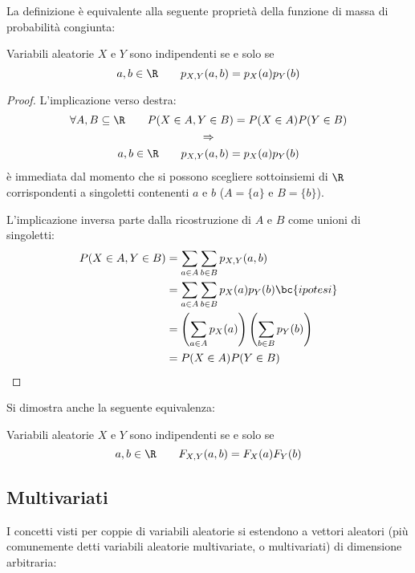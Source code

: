 La definizione è equivalente alla seguente proprietà della funzione di massa di probabilità congiunta:
\begin{prop}
	Variabili aleatorie $X$ e $Y$ sono indipendenti se e solo se
	\begin{equation*}
		a,b\in\R\qquad p_{X,Y}(a,b)=p_X(a)p_Y(b)
	\end{equation*}
\end{prop}
\begin{proof}
	L'implicazione verso destra:
	\begin{gather*}
		\forall A,B\subseteq\R\qquad P(X\in A, Y\in B)=P(X\in A)P(Y\in B) \\
		\Rightarrow \\
		a,b\in\R\qquad p_{X,Y}(a,b)=p_X(a)p_Y(b)
	\end{gather*}
	è immediata dal momento che si possono scegliere sottoinsiemi di $\R$ corrispondenti a singoletti contenenti $a$ e $b$ ($A=\{a\}$ e $B=\{b\}$).

	L'implicazione inversa parte dalla ricostruzione di $A$ e $B$ come unioni di singoletti:
	\begin{align*}
		P(X\in A, Y\in B) & = \sum_{a\in A}\sum_{b\in B} p_{X,Y}(a,b)                           \\
		                  & = \sum_{a\in A}\sum_{b\in B} p_X(a)p_Y(b) \bc{ipotesi}              \\
		                  & = \left(\sum_{a\in A}p_X(a)\right)\left(\sum_{b\in B} p_Y(b)\right) \\
		                  & = P(X\in A)P(Y\in B)
	\end{align*}
\end{proof}

Si dimostra anche la seguente equivalenza:
\begin{prop}
	Variabili aleatorie $X$ e $Y$ sono indipendenti se e solo se
	\begin{equation*}
		a,b\in\R\qquad F_{X,Y}(a,b)=F_X(a)F_Y(b)
	\end{equation*}
\end{prop}



\subsection{Multivariati}\label{Multivariati}
I concetti visti per coppie di variabili aleatorie si estendono a vettori aleatori (più comunemente detti variabili aleatorie multivariate, o multivariati) di dimensione arbitraria:


